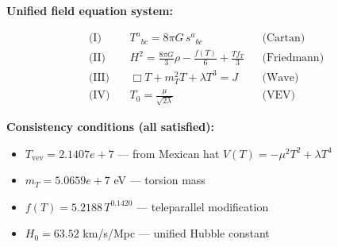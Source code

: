 
\textbf{Unified field equation system:}

\begin{align}
  \text{(I)} \quad & T^a{}_{bc} = 8\pi G \, s^a{}_{bc} && \text{(Cartan)} \\
  \text{(II)} \quad & H^2 = \frac{8\pi G}{3}\rho - \frac{f(T)}{6} + \frac{Tf_T}{3} && \text{(Friedmann)} \\
  \text{(III)} \quad & \Box T + m_T^2 T + \lambda T^3 = J && \text{(Wave)} \\
  \text{(IV)} \quad & T_0 = \frac{\mu}{\sqrt{2\lambda}} && \text{(VEV)}
\end{align}

\textbf{Consistency conditions (all satisfied):}
\begin{itemize}
  \item $T_{\text{vev}} = 2.1407e+7$ — from Mexican hat $V(T) = -\mu^2 T^2 + \lambda T^4$
  \item $m_T = 5.0659e+7$ eV — torsion mass
  \item $f(T) = 5.2188 \, T^{0.1420}$ — teleparallel modification
  \item $H_0 = 63.52$ km/s/Mpc — unified Hubble constant
\end{itemize}
